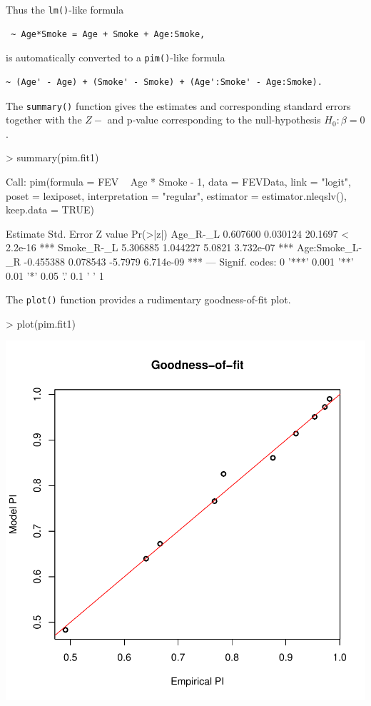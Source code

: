\documentclass[12pt]{article}
\begin{document}
Thus the \texttt{lm()}-like formula 
\begin{verbatim}
 ~ Age*Smoke = Age + Smoke + Age:Smoke,
\end{verbatim}
is automatically converted to a \texttt{pim()}-like formula
\begin{verbatim}
~ (Age' - Age) + (Smoke' - Smoke) + (Age':Smoke' - Age:Smoke).
\end{verbatim}
The \texttt{summary()} function gives the estimates and corresponding standard errors together with the $Z-$ and p-value corresponding to the null-hypothesis $H_0: \beta = 0$. 
\begin{Schunk}
\begin{Sinput}
> summary(pim.fit1)
\end{Sinput}
\begin{Soutput}
Call:
pim(formula = FEV ~ Age * Smoke - 1, data = FEVData, link = "logit", 
    poset = lexiposet, interpretation = "regular", estimator = estimator.nleqslv(), 
    keep.data = TRUE)

                Estimate Std. Error Z value  Pr(>|z|)    
Age_R-_L        0.607600   0.030124 20.1697 < 2.2e-16 ***
Smoke_R-_L      5.306885   1.044227  5.0821 3.732e-07 ***
Age:Smoke_L-_R -0.455388   0.078543 -5.7979 6.714e-09 ***
---
Signif. codes:  0 '***' 0.001 '**' 0.01 '*' 0.05 '.' 0.1 ' ' 1 
\end{Soutput}
\end{Schunk}
The \texttt{plot()} function provides a rudimentary goodness-of-fit plot.
\begin{center}
\begin{Schunk}
\begin{Sinput}
> plot(pim.fit1)
\end{Sinput}
\end{Schunk}
\includegraphics{pim-004}
\end{center}
\end{document}
